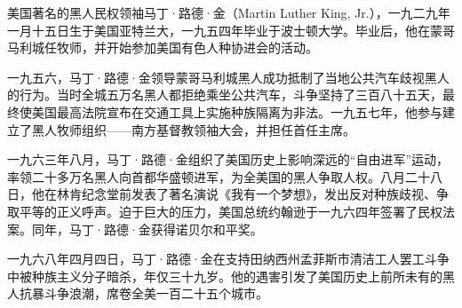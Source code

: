 \begin{maonote}
美国著名的黑人民权领袖马丁·路德·金（Martin Luther King, Jr.），一九二九年一月十五日生于美国亚特兰大，一九五四年毕业于波士顿大学。毕业后，他在蒙哥马利城任牧师，并开始参加美国有色人种协进会的活动。

一九五六，马丁·路德·金领导蒙哥马利城黑人成功抵制了当地公共汽车歧视黑人的行为。当时全城五万名黑人都拒绝乘坐公共汽车，斗争坚持了三百八十五天，最终使美国最高法院宣布在交通工具上实施种族隔离为非法。一九五七年，他参与建立了黑人牧师组织——南方基督教领袖大会，并担任首任主席。

一九六三年八月，马丁·路德·金组织了美国历史上影响深远的“自由进军”运动，率领二十多万名黑人向首都华盛顿进军，为全美国的黑人争取人权。八月二十八日，他在林肯纪念堂前发表了著名演说《我有一个梦想》，发出反对种族歧视、争取平等的正义呼声。迫于巨大的压力，美国总统约翰逊于一九六四年签署了民权法案。同年，马丁·路德·金获得诺贝尔和平奖。

一九六八年四月四日，马丁·路德·金在支持田纳西州孟菲斯市清洁工人罢工斗争中被种族主义分子暗杀，年仅三十九岁。他的遇害引发了美国历史上前所未有的黑人抗暴斗争浪潮，席卷全美一百二十五个城市。
\end{maonote}
